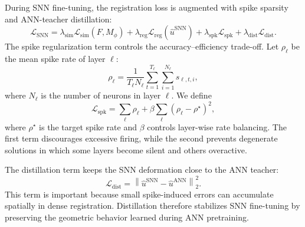 
During SNN fine-tuning, the registration loss is augmented with spike sparsity and ANN-teacher distillation:
\begin{equation}
    \mathcal{L}_{\mathrm{SNN}}
    =
    \lambda_{\mathrm{sim}}\mathcal{L}_{\mathrm{sim}}(F,M_{\phi})
    +
    \lambda_{\mathrm{reg}}\mathcal{L}_{\mathrm{reg}}(\hat{u}^{\mathrm{SNN}})
    +
    \lambda_{\mathrm{spk}}\mathcal{L}_{\mathrm{spk}}
    +
    \lambda_{\mathrm{dist}}\mathcal{L}_{\mathrm{dist}}.
\end{equation}
The spike regularization term controls the accuracy--efficiency trade-off. Let $\rho_{\ell}$ be the mean spike rate of layer $\ell$:
\begin{equation}
    \rho_{\ell}
    =
    \frac{1}{T_{\ell}N_{\ell}}
    \sum_{t=1}^{T_{\ell}}
    \sum_{i=1}^{N_{\ell}}
    s_{\ell,t,i},
\end{equation}
where $N_{\ell}$ is the number of neurons in layer $\ell$. We define
\begin{equation}
    \mathcal{L}_{\mathrm{spk}}
    =
    \sum_{\ell}
    \rho_{\ell}
    +
    \beta
    \sum_{\ell}
    (\rho_{\ell}-\rho^{\star})^{2},
\end{equation}
where $\rho^{\star}$ is the target spike rate and $\beta$ controls layer-wise rate balancing. The first term discourages excessive firing, while the second prevents degenerate solutions in which some layers become silent and others overactive.

The distillation term keeps the SNN deformation close to the ANN teacher:
\begin{equation}
    \mathcal{L}_{\mathrm{dist}}
    =
    \left\|
    \hat{u}^{\mathrm{SNN}}
    -
    \hat{u}^{\mathrm{ANN}}
    \right\|_{2}^{2}.
\end{equation}
This term is important because small spike-induced errors can accumulate spatially in dense registration. Distillation therefore stabilizes SNN fine-tuning by preserving the geometric behavior learned during ANN pretraining.


